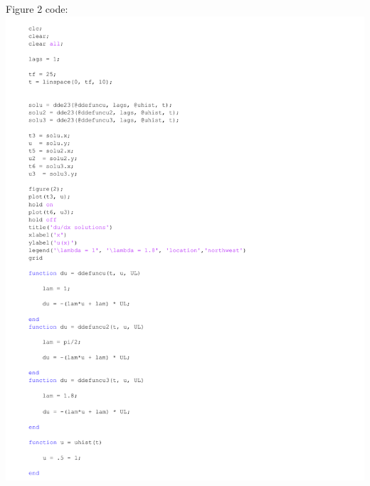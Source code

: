 \documentclass{article}
\begin{document}
\begin{center}
    \LARGE Figure 2 code:
    \includegraphics[width=15cm]{Figure_2I.pdf}
\end{center}
\newpage
\end{document}

